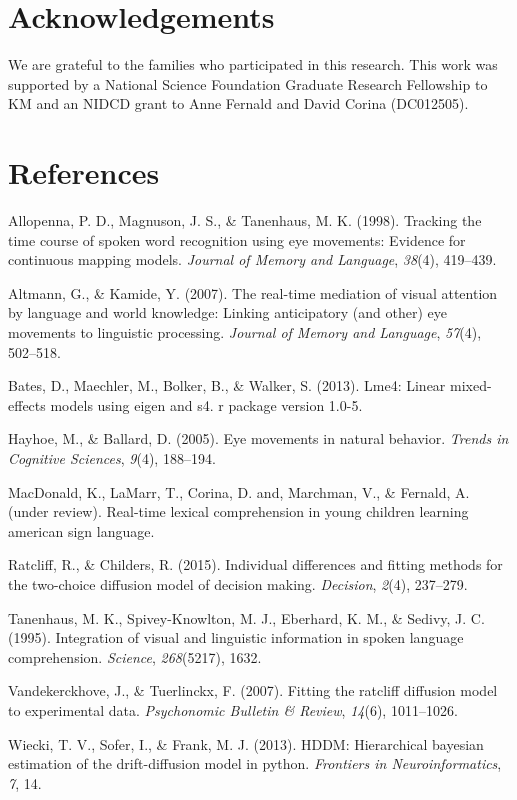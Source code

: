 \documentclass[10pt, letterpaper]{article}
\begin{document}
\section{Acknowledgements}\label{acknowledgements}

We are grateful to the families who participated in this research. This
work was supported by a National Science Foundation Graduate Research
Fellowship to KM and an NIDCD grant to Anne Fernald and David Corina
(DC012505).

\section{References}\label{references}

\setlength{\parindent}{-0.1in} \setlength{\leftskip}{0.125in} \noindent

\hypertarget{refs}{}
\hypertarget{ref-allopenna1998tracking}{}
Allopenna, P. D., Magnuson, J. S., \& Tanenhaus, M. K. (1998). Tracking
the time course of spoken word recognition using eye movements: Evidence
for continuous mapping models. \emph{Journal of Memory and Language},
\emph{38}(4), 419--439.

\hypertarget{ref-altmann2007real}{}
Altmann, G., \& Kamide, Y. (2007). The real-time mediation of visual
attention by language and world knowledge: Linking anticipatory (and
other) eye movements to linguistic processing. \emph{Journal of Memory
and Language}, \emph{57}(4), 502--518.

\hypertarget{ref-bates2013lme4}{}
Bates, D., Maechler, M., Bolker, B., \& Walker, S. (2013). Lme4: Linear
mixed-effects models using eigen and s4. r package version 1.0-5.

\hypertarget{ref-hayhoe2005eye}{}
Hayhoe, M., \& Ballard, D. (2005). Eye movements in natural behavior.
\emph{Trends in Cognitive Sciences}, \emph{9}(4), 188--194.

\hypertarget{ref-macdonald2017realtime}{}
MacDonald, K., LaMarr, T., Corina, D. and, Marchman, V., \& Fernald, A.
(under review). Real-time lexical comprehension in young children
learning american sign language.

\hypertarget{ref-ratcliff2015individual}{}
Ratcliff, R., \& Childers, R. (2015). Individual differences and fitting
methods for the two-choice diffusion model of decision making.
\emph{Decision}, \emph{2}(4), 237--279.

\hypertarget{ref-tanenhaus1995integration}{}
Tanenhaus, M. K., Spivey-Knowlton, M. J., Eberhard, K. M., \& Sedivy, J.
C. (1995). Integration of visual and linguistic information in spoken
language comprehension. \emph{Science}, \emph{268}(5217), 1632.

\hypertarget{ref-vandekerckhove2007fitting}{}
Vandekerckhove, J., \& Tuerlinckx, F. (2007). Fitting the ratcliff
diffusion model to experimental data. \emph{Psychonomic Bulletin \&
Review}, \emph{14}(6), 1011--1026.

\hypertarget{ref-wiecki2013hddm}{}
Wiecki, T. V., Sofer, I., \& Frank, M. J. (2013). HDDM: Hierarchical
bayesian estimation of the drift-diffusion model in python.
\emph{Frontiers in Neuroinformatics}, \emph{7}, 14.
\end{document}
